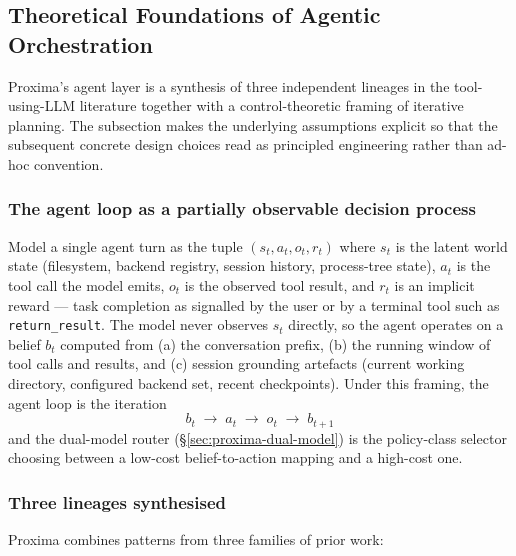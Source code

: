 \documentclass[11pt,a4paper]{article}
\begin{document}
\subsection{Theoretical Foundations of Agentic Orchestration}
\label{sec:proxima-theory}

Proxima's agent layer is a synthesis of three independent lineages in the
tool-using-LLM literature together with a control-theoretic framing of iterative
planning. The subsection makes the underlying assumptions explicit so that the
subsequent concrete design choices read as principled engineering rather than
ad-hoc convention.

\subsubsection*{The agent loop as a partially observable decision process}

Model a single agent turn as the tuple $(s_t, a_t, o_t, r_t)$ where $s_t$ is the
latent world state (filesystem, backend registry, session history, process-tree
state), $a_t$ is the tool call the model emits, $o_t$ is the observed tool result,
and $r_t$ is an implicit reward --- task completion as signalled by the user or by
a terminal tool such as \texttt{return\_result}. The model never observes $s_t$
directly, so the agent operates on a belief $b_t$ computed from (a) the
conversation prefix, (b) the running window of tool calls and results, and (c)
session grounding artefacts (current working directory, configured backend set,
recent checkpoints). Under this framing, the agent loop is the iteration
\[
  b_t \;\to\; a_t \;\to\; o_t \;\to\; b_{t+1}
\]
and the dual-model router (\S\ref{sec:proxima-dual-model}) is the policy-class
selector choosing between a low-cost belief-to-action mapping and a high-cost one.

\subsubsection*{Three lineages synthesised}

Proxima combines patterns from three families of prior work:
\end{document}
